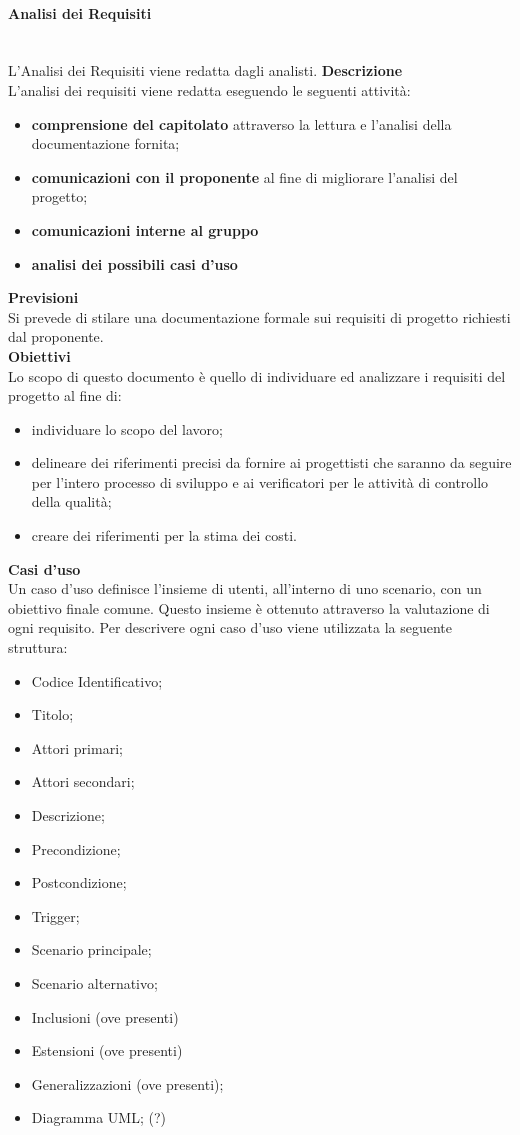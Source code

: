 \paragraph{Analisi dei Requisiti} \mbox{}
\\L'Analisi dei Requisiti viene redatta dagli analisti.
\textbf{Descrizione}\\
L'analisi dei requisiti viene redatta eseguendo le seguenti attività:
\begin{itemize}
	\item \textbf{comprensione del capitolato\glo} attraverso la lettura e l'analisi della documentazione fornita;
	\item \textbf{comunicazioni con il proponente} al fine di migliorare l'analisi del progetto;
	\item \textbf{comunicazioni interne al gruppo}
	\item \textbf{analisi dei possibili casi d'uso}
\end{itemize}
\textbf{Previsioni}\\
Si prevede di stilare una documentazione formale sui requisiti di progetto richiesti dal proponente.
\\ \textbf{Obiettivi}\\ 
Lo scopo di questo documento è quello di individuare ed analizzare i requisiti del progetto al fine di:
\begin{itemize}
	\item individuare lo scopo del lavoro;
	\item delineare dei riferimenti precisi da fornire ai progettisti che saranno da seguire per l'intero processo di sviluppo e ai verificatori per le attività di controllo della qualità;
	\item creare dei riferimenti per la stima dei costi.
\end{itemize}
\textbf{Casi d'uso}\\
Un caso d'uso definisce l'insieme di utenti, all'interno di uno scenario, con un obiettivo finale comune. Questo insieme è ottenuto attraverso la valutazione di ogni requisito.
Per descrivere ogni caso d'uso viene utilizzata la seguente struttura:
\begin{itemize}
	\item Codice Identificativo;
	\item Titolo;
	\item Attori primari;
	\item Attori secondari;
	\item Descrizione;
	\item Precondizione;
	\item Postcondizione;
	\item Trigger;
	\item Scenario principale;
	\item Scenario alternativo;
	\item Inclusioni (ove presenti)
	\item Estensioni (ove presenti)
	\item Generalizzazioni (ove presenti);
	
	\item Diagramma UML; (?)	
\end{itemize}

